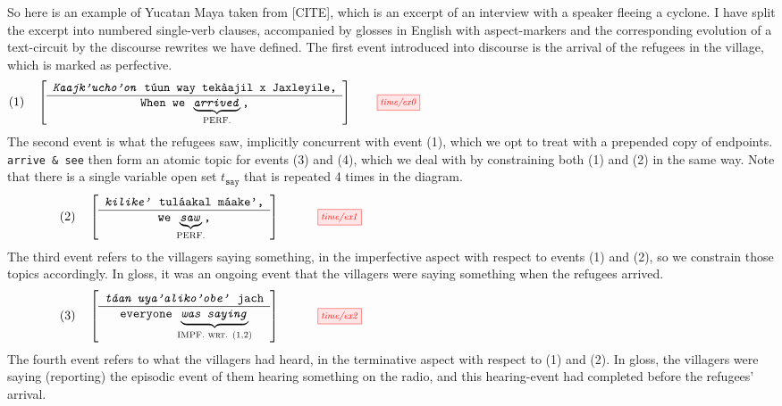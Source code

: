 \begin{example}
So here is an example of Yucatan Maya taken from [CITE], which is an excerpt of an interview with a speaker fleeing a cyclone. I have split the excerpt into numbered single-verb clauses, accompanied by glosses in English with aspect-markers and the corresponding evolution of a text-circuit by the discourse rewrites we have defined. The first event introduced into discourse is the arrival of the refugees in the village, which is marked as perfective.
\[(1) \quad \left[ \begin{array}{c}\texttt{\emph{Kaajk'ucho'on} t\'{u}un way tek\`{a}ajil x Jaxleyile,} \\ \hline \texttt{When we }\underbrace{\texttt{\emph{arrived}}}_{\textsc{\makebox[0pt]{PERF.}}}\texttt{,}\end{array} \right] \vcenter{\scalebox{0.75}{\tikzfig{time/ex0}}}\]
The second event is what the refugees saw, implicitly concurrent with event (1), which we opt to treat with a prepended copy of endpoints. \texttt{arrive \& see} then form an atomic topic for events (3) and (4), which we deal with by constraining both (1) and (2) in the same way. Note that there is a single variable open set $t_\texttt{say}$ that is repeated 4 times in the diagram.
\[(2) \quad \left[ \begin{array}{c} \texttt{\emph{kilike'} tul\'{a}akal m\'{a}ake',} \\ \hline \texttt{we } \underbrace{\texttt{\emph{saw}}}_{\textsc{\makebox[0pt]{PERF.}}}\texttt{,} \end{array} \right] \quad \vcenter{\scalebox{0.75}{\tikzfig{time/ex1}}}\]
The third event refers to the villagers saying something, in the imperfective aspect with respect to events (1) and (2), so we constrain those topics accordingly. In gloss, it was an ongoing event that the villagers were saying something when the refugees arrived.
\[(3) \quad \left[ \begin{array}{c} \texttt{\emph{t\'{a}an uya'aliko'obe'} jach} \\ \hline \texttt{everyone }\underbrace{\texttt{\emph{was saying}}}_{\textsc{\makebox[0pt]{IMPF. wrt. (1,2)}}}\end{array} \right] \quad \vcenter{\scalebox{0.75}{\tikzfig{time/ex2}}}\]
The fourth event refers to what the villagers had heard, in the terminative aspect with respect to (1) and (2). In gloss, the villagers were saying (reporting) the episodic event of them hearing something on the radio, and this hearing-event had completed before the refugees' arrival.

\end{example}
